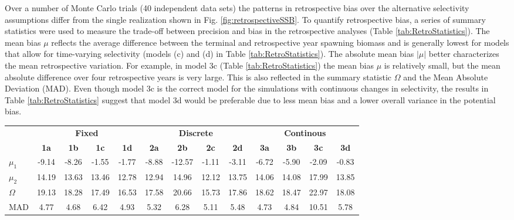 \documentclass[review,letterpaper,10pt,authoryear]{elsarticle}
\begin{document}
Over a number of Monte Carlo trials (40 independent data sets) the patterns in retrospective bias over the alternative selectivity assumptions differ from the single realization shown in Fig. \ref{fig:retrospectiveSSB}.  To quantify retrospective bias, a series of summary statistics were used to measure the trade-off between precision and bias in the retrospective analyses (Table \ref{tab:RetroStatistics}).  The mean bias $\mu$ reflects the average difference between the terminal and retrospective year spawning biomass and is generally lowest for models that allow for time-varying selectivity (models (c) and (d) in Table \ref{tab:RetroStatistics}).  The absolute mean bias $|\mu|$ better characterizes the mean retrospective  variation.  For example, in model 3c (Table \ref{tab:RetroStatistics}) the mean bias $\mu$ is relatively small, but the mean absolute difference over four retrospective years is very large.  This is also reflected in the summary statistic $\Omega$ and the Mean Absolute Deviation (MAD).  Even though model 3c is the correct model for the simulations with continuous changes in selectivity, the results in Table \ref{tab:RetroStatistics} suggest that model 3d would be preferable due to less mean bias and a lower overall variance in the potential bias.  

\begin{table*}[!tbh]
	\caption{Retrospective bias statistics for each model run, where $\mu_1$ corresponds to the mean bias over four retrospective years, $\mu_2$ is the absolute mean, $\Omega$ is a combined measure of mean and absolute bias, and MAD is the Mean Absolute Deviation of $\mu_2$.  Lower MAD scores imply less variability in retrospective bias estimates.}
	\label{tab:RetroStatistics}
	\begin{center}
	\begin{footnotesize}
		
		\begin{tabular}{l|cccc|cccc|cccc}
		\hline

		\hline
		&\multicolumn{4}{c|}{\textbf{Fixed}} & \multicolumn{4}{c|}{\textbf{Discrete}} & \multicolumn{4}{c}{\textbf{Continous}} \\
		&\textbf{1a}  &\textbf{1b}  &\textbf{1c}  &\textbf{1d}  &\textbf{2a}   &\textbf{2b}  &\textbf{2c}  &\textbf{2d}  &\textbf{3a}  &\textbf{3b}  &\textbf{3c}  &\textbf{3d}\\
		\hline
		$\mu_1$     &-9.14& -8.26& -1.55& -1.77& -8.88& -12.57& -1.11& -3.11& -6.72& -5.90& -2.09& -0.83\\
		$\mu_2$ &14.19& 13.63& 13.46& 12.78& 12.94&  14.96& 12.12& 13.75& 14.06& 14.08& 17.99& 13.85\\
		$\Omega$  &19.13& 18.28& 17.49& 16.53& 17.58&  20.66& 15.73& 17.86& 18.62& 18.47& 22.97& 18.08\\
		MAD    & 4.77&  4.68&  6.42&  4.93&  5.32&   6.28&  5.11&  5.48&  4.73&  4.84& 10.51&  5.78\\

		\hline

		\hline
		\end{tabular}
	\end{footnotesize}
	\end{center}
\end{table*}
\end{document}
